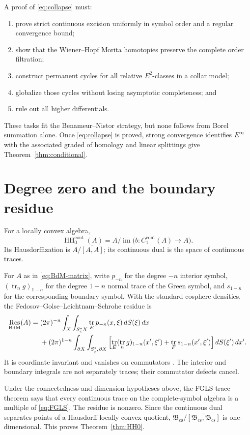 \documentclass[11pt,oneside,reqno]{article}
\DeclareMathOperator{\HH}{HH}
\DeclareMathOperator{\Res}{Res}
\DeclareMathOperator{\tr}{tr}
\newcommand{\Bcs}{\mathfrak B_{\mathrm{cs}}}
\theoremstyle{plain}
\theoremstyle{definition}
\theoremstyle{remark}
\begin{document}
A proof of \eqref{eq:collapse} must:
\begin{enumerate}
 \item prove strict continuous excision uniformly in symbol order and a
       regular convergence bound;
 \item show that the Wiener--Hopf Morita homotopies preserve the complete
       order filtration;
 \item construct permanent cycles for all relative \(E^2\)-classes in a
       collar model;
 \item globalize those cycles without losing asymptotic completeness; and
 \item rule out all higher differentials.
\end{enumerate}
These tasks fit the Benameur--Nistor strategy, but none follows from Borel
summation alone. Once \eqref{eq:collapse} is proved, strong convergence
identifies \(E^\infty\) with the associated graded of homology and linear
splittings give Theorem~\ref{thm:conditional}.

\section{Degree zero and the boundary residue}

For a locally convex algebra,
\[
 \HH_0^{\mathrm{cont}}(A)
 =A/\operatorname{im}\bigl(b:C_1^{\mathrm{cont}}(A)\to A\bigr).
\]
Its Hausdorffization is \(A/\overline{[A,A]}\); its continuous dual is the
space of continuous traces.

For \(A\) as in \eqref{eq:BdM-matrix}, write \(p_{-n}\) for the degree
\(-n\) interior symbol, \((\tr_n g)_{1-n}\) for the degree \(1-n\) normal
trace of the Green symbol, and \(s_{1-n}\) for the corresponding boundary
symbol. With the standard cosphere densities, the
Fedosov--Golse--Leichtnam--Schrohe residue is
\begin{align}\label{eq:FGLS}
 \Res_{\mathrm{BdM}}(A)
 ={}&(2\pi)^{-n}\int_X\int_{S_x^*X}
       \tr_E p_{-n}(x,\xi)\,dS(\xi)\,dx\notag\\
 &+(2\pi)^{1-n}\int_{\partial X}\int_{S_{x'}^*\partial X}
 \left[
  \tr_E(\tr_n g)_{1-n}(x',\xi')
  +\tr_Fs_{1-n}(x',\xi')
 \right]dS(\xi')\,dx'.
\end{align}
It is coordinate invariant and vanishes on commutators
\cite{FGLS,Schrohe,GS}. The interior and boundary integrals are not
separately traces; their commutator defects cancel.

Under the connectedness and dimension hypotheses above, the FGLS trace
theorem says that every continuous trace on the complete-symbol algebra is a
multiple of \eqref{eq:FGLS}. The residue is nonzero. Since the continuous
dual separates points of a Hausdorff locally convex quotient,
\(\Bcs/\overline{[\Bcs,\Bcs]}\) is one-dimensional. This proves
Theorem~\ref{thm:HH0}.
\end{document}
